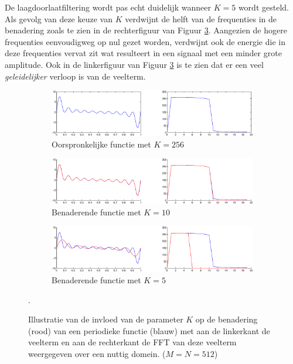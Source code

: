 \documentclass[a4paper]{article}
\begin{document}
De laagdoorlaatfiltering wordt pas echt duidelijk wanneer $K=5$ wordt gesteld. Als gevolg van deze keuze van $K$ verdwijnt de helft van de frequenties in de benadering zoals te zien in de rechterfiguur van Figuur \ref{fig:periotrigc}. Aangezien de hogere frequenties eenvoudigweg op nul gezet worden, verdwijnt ook de energie die in deze frequenties vervat zit wat resulteert in een signaal met een minder grote amplitude. Ook in de linkerfiguur van Figuur \ref{fig:periotrigc} is te zien dat er een veel \textit{geleidelijker} verloop is van de veelterm.
\begin{figure}
    \centering
    \begin{subfigure}[b]{\textwidth}
        \centering
        \includegraphics[width=\textwidth, height=0.3\textwidth]{periotriga.eps}
        \caption{Oorspronkelijke functie met $K=256$}
        \label{fig:periotriga}
        \vspace*{1cm}
    \end{subfigure}
    \begin{subfigure}[b]{\textwidth}
        \centering
        \includegraphics[width=\textwidth]{periotrigb.eps}
        \caption{Benaderende functie met $K=10$}
        \label{fig:periotrigb}
        \vspace*{1cm}
    \end{subfigure}
    \hfill
    \begin{subfigure}[b]{\textwidth}
        \centering
        \includegraphics[width=\textwidth]{periotrigc.eps}
        \caption{Benaderende functie met $K=5$}
        \label{fig:periotrigc}
        \vspace*{1cm}
    \end{subfigure}
    \caption{Illustratie van de invloed van de parameter $K$ op de benadering (rood) van een periodieke functie (blauw) met aan de linkerkant de veelterm en aan de rechterkant de FFT van deze veelterm weergegeven over een nuttig domein. ($M = N = 512$)}\label{fig:periotrig}.
\end{figure}
\end{document}
